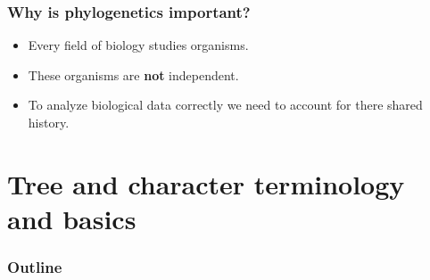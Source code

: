 \begin{frame}
    \frametitle{Why is phylogenetics important?}
    \begin{itemize}
        \item Every field of biology studies organisms.
        \item These organisms are \textbf{not} independent.
        \item To analyze biological data correctly we need to account for there
            shared history.
    \end{itemize}
\end{frame}


\section{Tree and character terminology and basics}

\begin{frame}
\frametitle{Outline}
\tableofcontents[currentsection]
\end{frame}

